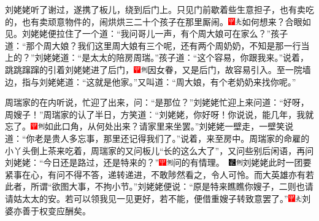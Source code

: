 刘姥姥听了谢过，遂携了板儿，绕到后门上。只见门前歇着些生意担子，也有卖吃的，也有卖顽意物件的，闹烘烘三二十个孩子在那里厮闹。{\includegraphics[width=3mm]{../Images/00002}\includegraphics[width=3mm]{../Images/00012}\footnotesize \kaishu 如何想来？合眼如见。}刘姥姥便拉住了一个道：“我问哥儿一声，有个周大娘可在家么？”孩子道：“那个周大娘？我们这里周大娘有三个呢，还有两个周奶奶，不知是那一行当上的？”刘姥姥道：“是太太的陪房周瑞。”孩子道：“这个容易，你跟我来。”说着，跳跳蹿蹿的引着刘姥姥进了后门，{\includegraphics[width=3mm]{../Images/00002}\includegraphics[width=3mm]{../Images/00011}\footnotesize \kaishu 因女眷，又是后门，故容易引入。}至一院墙边，指与刘姥姥道：“这就是他家。”又叫道：“周大娘，有个老奶奶来找你呢。”

周瑞家的在内听说，忙迎了出来，问：“是那位？”刘姥姥忙迎上来问道：“好呀，周嫂子！”周瑞家的认了半日，方笑道：“刘姥姥，你好呀！你说说，能几年，我就忘了。{\includegraphics[width=3mm]{../Images/00002}\includegraphics[width=3mm]{../Images/00011}\footnotesize \kaishu 如此口角，从何处出来？}请家里来坐罢。”刘姥姥一壁走，一壁笑说道：“你老是贵人多忘事，那里还记得我们了。”说着，来至房中。周瑞家的命雇的小丫头倒上茶来吃着，周瑞家的又问板儿“长的这么大了”，又问些别后闲语，再问刘姥姥：“今日还是路过，还是特来的？”{{\includegraphics[width=3mm]{../Images/00002}\includegraphics[width=3mm]{../Images/00011}\footnotesize \kaishu 问的有情理。　}\includegraphics[width=3mm]{../Images/00006}\includegraphics[width=3mm]{../Images/00011}\footnotesize \kaishu 刘姥姥此时一团要紧事在心，有问不得不答，递转递进，不敢陟然看之，令人可怜。而大英雄亦有若此者，所谓“欲图大事，不拘小节。”}刘姥姥便说：“原是特来瞧瞧你嫂子，二则也请请姑太太的安。若可以领我见一见更好，若不能，便借重嫂子转致意罢了。”{\includegraphics[width=3mm]{../Images/00002}\includegraphics[width=3mm]{../Images/00012}\footnotesize \kaishu 刘婆亦善于权变应酬矣。}

